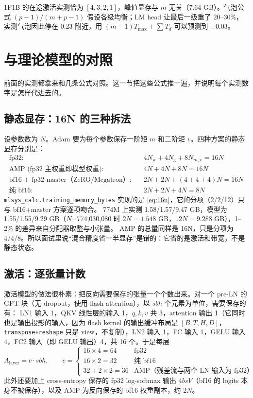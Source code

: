 \documentclass[11pt,a4paper]{ctexart}
\begin{document}
\begin{findingbox}[：流水线]
1F1B 的在途激活实测恰为 $[4,3,2,1]$，峰值显存与 $m$ 无关（7.64 GB）。气泡公式 $(p-1)/(m+p-1)$ 假设各级均衡；LM head 让最后一级重了 20--30\%，实测气泡因此停在 0.23 附近，用 $(m-1)T_{\max}+\sum T_d$ 可以预测到 $\pm0.03$。
\end{findingbox}

\section{与理论模型的对照}

前面的实测都拿来和几条公式对照。这一节把这些公式推一遍，并说明每个实测数字是怎样代进去的。

\subsection{静态显存：16N 的三种拆法}
设参数数为 $N$。Adam 要为每个参数保存一阶矩 $m$ 和二阶矩 $v$。四种方案的静态显存分别是：
\begin{align}
\text{fp32:}\quad & 4N_{\text{w}} + 4N_{\text{g}} + 8N_{m,v} = 16N \\
\text{AMP (fp32 主权重即模型权重):}\quad & 4N + 4N + 8N = 16N \\
\text{bf16 + fp32 master（ZeRO/Megatron）:}\quad & 2N + 2N + (4+4+4)N = 16N \label{eq:16n}\\
\text{纯 bf16:}\quad & 2N + 2N + 4N = 8N
\end{align}
\texttt{mlsys\_calc.training\_memory\_bytes} 实现的是 \cref{eq:16n}，它的分项（2/2/12）只与 bf16+master 方案逐项吻合。
774M 上实测 1.58/1.57/9.47 GB，模型为 1.55/1.55/9.29 GB（$N$=774,030,080 时 $2N=1.548$ GB，$12N=9.288$ GB），1--2\% 的差异来自分配器取整与小张量。
AMP 的总量同样是 16N，只是分项为 4/4/8。所以面试里说“混合精度省一半显存”是错的：它省的是激活和带宽，不是静态状态。

\subsection{激活：逐张量计数}\label{sec:theory-act}
激活模型的做法很朴素：把反向需要保存的张量一个个数出来。对一个 pre-LN 的 GPT 块（无 dropout，使用 flash attention），以 $sbh$ 个元素为单位，需要保存的有：
LN1 输入 1，QKV 线性层的输入 1，$q,k,v$ 共 3，attention 输出 1（它同时也是输出投影的输入，因为 flash kernel 的输出缓冲布局是 $[B,T,H,D]$，
\texttt{transpose+reshape} 只是 view，不复制），LN2 输入 1，FC 输入 1，GELU 输入 4，FC2 输入（即 GELU 输出）4，共 16 个。于是每层
\begin{equation}
A_{\text{layer}} = c\cdot s b h,\qquad c=\begin{cases}16\times4=64 & \text{fp32}\\ 16\times2=32 & \text{纯 bf16}\\ 32+2\times2=36 & \text{AMP（残差流与两个 LN 输入为 fp32）}\end{cases}
\end{equation}
此外还要加上 cross-entropy 保存的 fp32 log-softmax 输出 $4bsV$（bf16 的 logits 本身不被保存），以及 AMP 为反向保存的 bf16 权重副本，约 $2N$。
\end{document}
